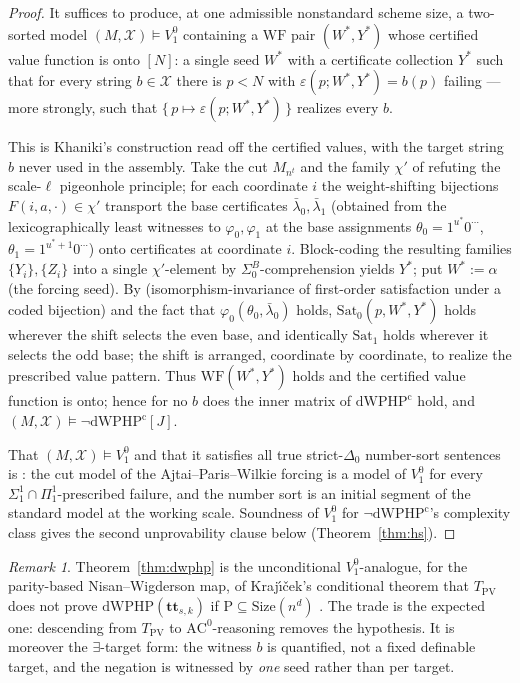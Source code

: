 \documentclass[11pt]{article}
\theoremstyle{definition}
\theoremstyle{remark}
\newtheorem{remark}[theorem]{Remark}
\newcommand{\Vone}{V^0_1}
\newcommand{\Sat}{\mathrm{Sat}}
\newcommand{\WF}{\mathrm{WF}}
\newcommand{\dWPHPcert}{\mathrm{dWPHP}^{\mathrm{c}}}
\newcommand{\SigmaB}{\Sigma^B_0}
\begin{document}
\begin{proof}
It suffices to produce, at one admissible nonstandard scheme size, a two-sorted
model $(M,\mathcal X)\models\Vone$ containing a $\WF$ pair $(W^\ast,Y^\ast)$
whose certified value function is onto $[N]$: a single seed $W^\ast$ with a
certificate collection $Y^\ast$ such that for every string $b\in\mathcal X$ there
is $p<N$ with $\varepsilon(p;W^\ast,Y^\ast)=b(p)$ failing --- more strongly, such
that $\{\,p\mapsto\varepsilon(p;W^\ast,Y^\ast)\,\}$ realizes every $b$.

This is Khaniki's construction \cite[\S4]{Khaniki2022} read off the certified
values, with the target string $b$ never used in the assembly. Take the cut
$M_{n^t}$ and the family $\chi'$ of \cite[Lemma 4.5]{Khaniki2022} refuting the
scale-$\ell$ pigeonhole principle; for each coordinate $i$ the weight-shifting
bijections $F(i,a,\cdot)\in\chi'$ transport the base certificates
$\bar\lambda_0,\bar\lambda_1$ (obtained from the lexicographically least
witnesses to $\varphi_0,\varphi_1$ at the base assignments
$\theta_0=1^{u^\ast}0^{\cdots}$, $\theta_1=1^{u^\ast+1}0^{\cdots}$) onto
certificates at coordinate $i$. Block-coding the resulting families
$\{Y_i\},\{Z_i\}$ into a single $\chi'$-element by $\SigmaB$-comprehension yields
$Y^\ast$; put $W^\ast:=\alpha$ (the forcing seed). By
\cite[Lemma 2.1]{Khaniki2022} (isomorphism-invariance of first-order
satisfaction under a coded bijection) and the fact that $\varphi_0(\theta_0,
\bar\lambda_0)$ holds, $\Sat_0(p,W^\ast,Y^\ast)$ holds wherever the shift selects
the even base, and identically $\Sat_1$ holds wherever it selects the odd base;
the shift is arranged, coordinate by coordinate, to realize the prescribed
value pattern. Thus $\WF(W^\ast,Y^\ast)$ holds and the certified value function
is onto; hence for no $b$ does the inner matrix of $\dWPHPcert$ hold, and
$(M,\mathcal X)\models\neg\dWPHPcert[J]$.

That $(M,\mathcal X)\models\Vone$ and that it satisfies all true strict-$\Delta_0$
number-sort sentences is \cite[Theorem 2.3]{Khaniki2022}: the cut model of the
Ajtai--Paris--Wilkie forcing is a model of $\Vone$ for every $\Sigma^1_1\cap
\Pi^1_1$-prescribed failure, and the number sort is an initial segment of the
standard model at the working scale. Soundness of $\Vone$ for
$\neg\dWPHPcert$'s complexity class gives the second unprovability clause below
(Theorem~\ref{thm:hs}).
\end{proof}

\begin{remark}
Theorem~\ref{thm:dwphp} is the unconditional $\Vone$-analogue, for the
parity-based Nisan--Wigderson map, of Kraj\'{\i}\v{c}ek's conditional theorem
that $T_{\mathrm{PV}}$ does not prove $\mathrm{dWPHP}(\mathbf{tt}_{s,k})$ if
$\mathrm{P}\subseteq\mathrm{Size}(n^d)$ \cite[Theorem 1]{Krajicek2021}. The
trade is the expected one: descending from $T_{\mathrm{PV}}$ to
$\mathrm{AC}^0$-reasoning removes the hypothesis. It is moreover the
$\exists$-target form: the witness $b$ is quantified, not a fixed definable
target, and the negation is witnessed by \emph{one} seed rather than per
target.
\end{remark}
\end{document}
